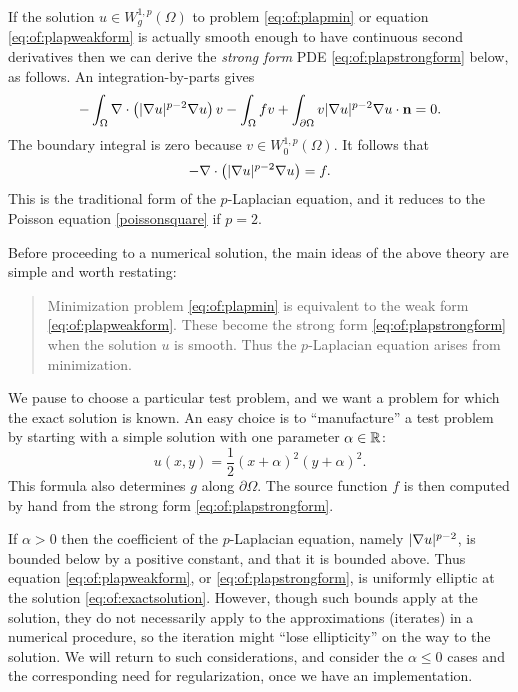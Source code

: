 If the solution $u \in W_g^{1,p}(\Omega)$ to problem \eqref{eq:of:plapmin} or equation \eqref{eq:of:plapweakform} is actually smooth enough to have continuous second derivatives then we can derive the \emph{strong form} PDE \eqref{eq:of:plapstrongform} below, as follows.  An integration-by-parts \citep[Appendix C]{Evans2010} gives
    $$-\int_\Omega \nabla\cdot\left(|\nabla u|^{p-2} \nabla u\right) v - \int_\Omega f v + \int_{\partial \Omega} v |\nabla u|^{p-2} \nabla u \cdot \mathbf{n} = 0.$$
The boundary integral is zero because $v\in W_0^{1,p}(\Omega)$.  It follows that
\begin{equation}
- \nabla\cdot\left(|\nabla u|^{p-2} \nabla u\right) = f.
\label{eq:of:plapstrongform}
\end{equation}
This is the traditional form of the $p$-Laplacian equation, and it reduces to the Poisson equation \eqref{poissonsquare} if $p=2$.

Before proceeding to a numerical solution, the main ideas of the above theory are simple and worth restating:
\begin{quote}
Minimization problem \eqref{eq:of:plapmin} is equivalent to the weak form \eqref{eq:of:plapweakform}.  These become the strong form \eqref{eq:of:plapstrongform} when the solution $u$ is smooth.  Thus the $p$-Laplacian equation arises from minimization.
\end{quote}

We pause to choose a particular test problem, and we want a problem for which the exact solution is known.  An easy choice is to ``manufacture'' a test problem by starting with a simple solution with one parameter $\alpha\in\mathbb{R}$:
\begin{equation}
    u(x,y) = \frac{1}{2} (x+\alpha)^2 (y+\alpha)^2. \label{eq:of:exactsolution}
\end{equation}
This formula also determines $g$ along $\partial \Omega$.  The source function $f$ is then computed by hand from the strong form \eqref{eq:of:plapstrongform}.

If $\alpha>0$ then the coefficient of the $p$-Laplacian equation, namely $|\nabla u|^{p-2}$, is bounded below by a positive constant, and that it is bounded above.  Thus equation \eqref{eq:of:plapweakform}, or \eqref{eq:of:plapstrongform}, is uniformly elliptic \citep{Evans2010} at the solution \eqref{eq:of:exactsolution}.  However, though such bounds apply at the solution, they do not necessarily apply to the approximations (iterates) in a numerical procedure, so the iteration might ``lose ellipticity'' on the way to the solution.  We will return to such considerations, and consider the $\alpha \le 0$ cases and the corresponding need for regularization, once we have an implementation.


